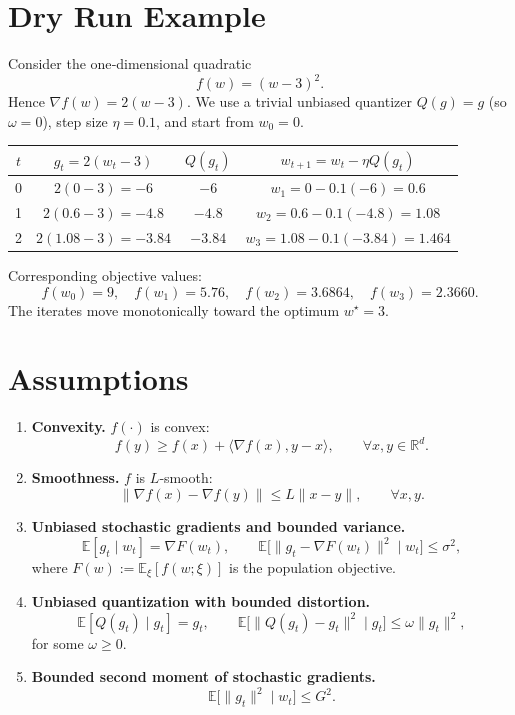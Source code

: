 \documentclass{article}
\begin{document}
\section*{Dry Run Example}
Consider the one‑dimensional quadratic
\[
f(w)=(w-3)^2 .
\]
Hence $\nabla f(w)=2(w-3)$.  
We use a trivial unbiased quantizer $Q(g)=g$ (so $\omega=0$), step size
$\eta=0.1$, and start from $w_0=0$.

\begin{center}
\begin{tabular}{c|c|c|c}
$t$ & $g_t=2(w_t-3)$ & $Q(g_t)$ & $w_{t+1}=w_t-\eta Q(g_t)$ \\ \hline
0 & $2(0-3)=-6$ & $-6$ & $w_1=0-0.1(-6)=0.6$ \\
1 & $2(0.6-3)=-4.8$ & $-4.8$ & $w_2=0.6-0.1(-4.8)=1.08$ \\
2 & $2(1.08-3)=-3.84$ & $-3.84$ & $w_3=1.08-0.1(-3.84)=1.464$ \\
\end{tabular}
\end{center}
Corresponding objective values:
\[
f(w_0)=9,\quad f(w_1)=5.76,\quad f(w_2)=3.6864,\quad f(w_3)=2.3660.
\]
The iterates move monotonically toward the optimum $w^\star=3$.

\section*{Assumptions}
\begin{enumerate}[label=(A\arabic*)]
\item \textbf{Convexity.} $f(\cdot)$ is convex:
\[
f(y)\ge f(x)+\langle\nabla f(x),y-x\rangle,\qquad\forall x,y\in\mathbb{R}^d .
\tag{A1}
\]

\item \textbf{Smoothness.} $f$ is $L$‑smooth:
\[
\|\nabla f(x)-\nabla f(y)\|\le L\|x-y\|,\qquad\forall x,y.
\tag{A2}
\]

\item \textbf{Unbiased stochastic gradients and bounded variance.}
\[
\mathbb{E}[g_t\mid w_t]=\nabla F(w_t),\qquad 
\mathbb{E}\!\big[\|g_t-\nabla F(w_t)\|^{2}\mid w_t\big]\le\sigma^{2},
\tag{A3}
\]
where $F(w):=\mathbb{E}_{\xi}[f(w;\xi)]$ is the population objective.

\item \textbf{Unbiased quantization with bounded distortion.}
\[
\mathbb{E}[Q(g_t)\mid g_t]=g_t,\qquad 
\mathbb{E}\!\big[\|Q(g_t)-g_t\|^{2}\mid g_t\big]\le\omega\|g_t\|^{2},
\tag{A4}
\]
for some $\omega\ge0$.

\item \textbf{Bounded second moment of stochastic gradients.}
\[
\mathbb{E}\!\big[\|g_t\|^{2}\mid w_t\big]\le G^{2}.
\tag{A5}
\]
\end{enumerate}
\end{document}

